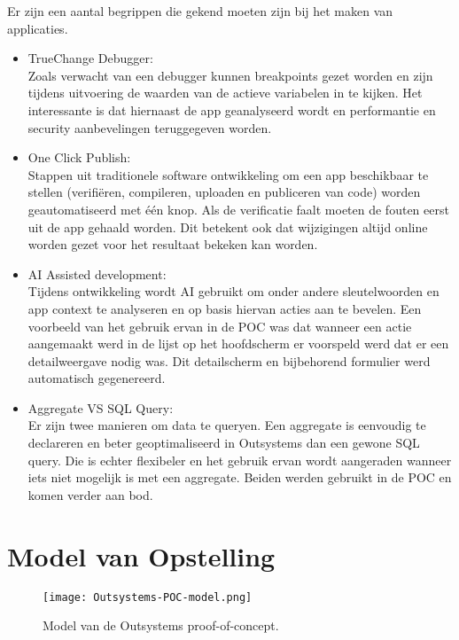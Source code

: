 Er zijn een aantal begrippen die gekend moeten zijn bij het maken van applicaties.
\begin{itemize}
    \item TrueChange Debugger:\\
    Zoals verwacht van een debugger kunnen breakpoints gezet worden en zijn tijdens uitvoering de waarden van de actieve variabelen in te kijken. Het interessante is dat hiernaast de app geanalyseerd wordt en performantie en security aanbevelingen teruggegeven worden.
    \item One Click Publish:\\
    Stappen uit traditionele software ontwikkeling om een app beschikbaar te stellen (verifiëren, compileren, uploaden en publiceren van code) worden geautomatiseerd met één knop. Als de verificatie faalt moeten de fouten eerst uit de app gehaald worden.
    Dit betekent ook dat wijzigingen altijd online worden gezet voor het resultaat bekeken kan worden.
    \item AI Assisted development:\\
    Tijdens ontwikkeling wordt AI gebruikt om onder andere sleutelwoorden en app context te analyseren en op basis hiervan acties aan te bevelen. Een voorbeeld van het gebruik ervan in de POC was dat wanneer een actie aangemaakt werd in de lijst op het hoofdscherm er voorspeld werd dat er een detailweergave nodig was. Dit detailscherm en bijbehorend formulier werd automatisch gegenereerd.
    \item Aggregate VS SQL Query:\\
    Er zijn twee manieren om data te queryen. Een aggregate is eenvoudig te declareren en beter geoptimaliseerd in Outsystems dan een gewone SQL query. Die is echter flexibeler en het gebruik ervan wordt aangeraden wanneer iets niet mogelijk is met een aggregate. Beiden werden gebruikt in de POC en komen verder aan bod.
\end{itemize}

\section{Model van Opstelling}

\begin{figure}[h!]
    \centering
    \texttt{[image: Outsystems-POC-model.png]}
    \caption{Model van de Outsystems proof-of-concept.}
    \label{fig:Outsystems-POC-model}
\end{figure}

